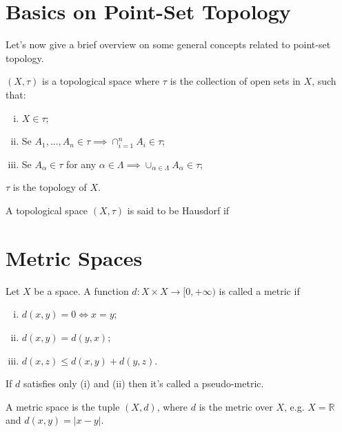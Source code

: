 \section{Basics on Point-Set Topology}

Let's now give a brief overview on some general concepts related
to point-set topology.

\begin{definition}
	$(X,\tau)$ is a topological space where $\tau$ is the collection of open
	sets in $X$, such that:
	\begin{enumerate}[(i)]
		\item $X \in \tau$;
		\item Se $A_1,...,A_n \in \tau \implies \cap_{i=1}^n A_i \in \tau$;
		\item Se $A_\alpha \in \tau$ for any $\alpha \in \Lambda \implies \cup_{\alpha \in \Lambda} A_\alpha \in \tau$;
	\end{enumerate}
	$\tau$ is the topology of $X$.
\end{definition}

\begin{definition}
    A topological space $(X, \tau)$ is said to be Hausdorf if
\end{definition}


\section{Metric Spaces}

\begin{definition}[Metric]
	Let $X$ be a space. A function $d:X\times X \to \mathbb [0,+\infty)$ is called a metric if
	\begin{enumerate}[(i)]
		\item $d(x,y) = 0 \iff x =y$;
		\item $d(x,y) = d(y,x)$;
		\item $d(x,z) \leq d(x,y) + d(y,z)$.
	\end{enumerate}
	If $d$ satisfies only (i) and (ii) then it's called a pseudo-metric.
\end{definition}

\begin{definition}
	A metric space is the tuple $(X,d)$, where $d$ is the metric over $X$,
	e.g. $X=\mathbb R$ and $d(x,y) = |x-y|$.
\end{definition}
